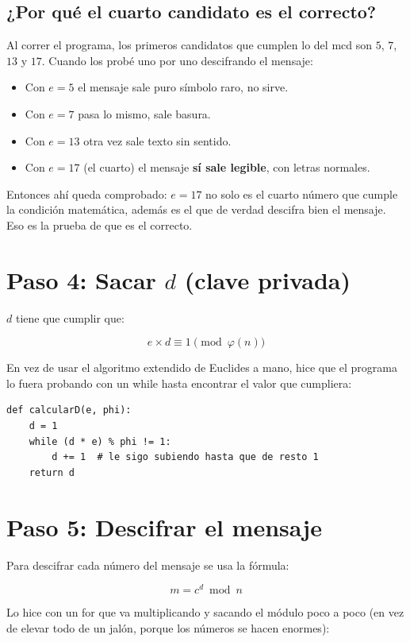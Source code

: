 \documentclass[11pt]{article}
\begin{document}
\subsection{¿Por qué el cuarto candidato es el correcto?}

Al correr el programa, los primeros candidatos que cumplen lo del mcd son
$5$, $7$, $13$ y $17$. Cuando los probé uno por uno descifrando el mensaje:

\begin{itemize}
    \item Con $e = 5$ el mensaje sale puro símbolo raro, no sirve.
    \item Con $e = 7$ pasa lo mismo, sale basura.
    \item Con $e = 13$ otra vez sale texto sin sentido.
    \item Con $e = 17$ (el cuarto) el mensaje \textbf{sí sale legible}, con
    letras normales.
\end{itemize}

Entonces ahí queda comprobado: $e = 17$ no solo es el cuarto número que
cumple la condición matemática, además es el que de verdad
descifra bien el mensaje. Eso es la prueba de que es el correcto.

\section{Paso 4: Sacar $d$ (clave privada)}

$d$ tiene que cumplir que:

\[
e \times d \equiv 1 \pmod{\varphi(n)}
\]

En vez de usar el algoritmo extendido de Euclides a mano, hice que el
programa lo fuera probando con un while hasta encontrar el valor que
cumpliera:

\begin{lstlisting}
def calcularD(e, phi):
    d = 1
    while (d * e) % phi != 1:
        d += 1  # le sigo subiendo hasta que de resto 1
    return d
\end{lstlisting}

\section{Paso 5: Descifrar el mensaje}

Para descifrar cada número del mensaje se usa la fórmula:

\[
m = c^{d} \bmod n
\]

Lo hice con un for que va multiplicando y sacando el módulo poco a poco
(en vez de elevar todo de un jalón, porque los números se hacen enormes):
\end{document}
